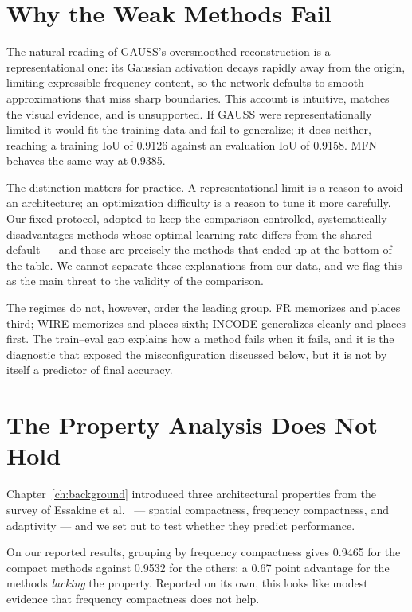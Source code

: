 \section{Why the Weak Methods Fail}

The natural reading of GAUSS's oversmoothed reconstruction is a representational one: its Gaussian activation decays rapidly away from the origin, limiting expressible frequency content, so the network defaults to smooth approximations that miss sharp boundaries. This account is intuitive, matches the visual evidence, and is unsupported. If GAUSS were representationally limited it would fit the training data and fail to generalize; it does neither, reaching a training IoU of 0.9126 against an evaluation IoU of 0.9158. MFN behaves the same way at 0.9385.

The distinction matters for practice. A representational limit is a reason to avoid an architecture; an optimization difficulty is a reason to tune it more carefully. Our fixed protocol, adopted to keep the comparison controlled, systematically disadvantages methods whose optimal learning rate differs from the shared default --- and those are precisely the methods that ended up at the bottom of the table. We cannot separate these explanations from our data, and we flag this as the main threat to the validity of the comparison.

The regimes do not, however, order the leading group. FR memorizes and places third; WIRE memorizes and places sixth; INCODE generalizes cleanly and places first. The train--eval gap explains how a method fails when it fails, and it is the diagnostic that exposed the misconfiguration discussed below, but it is not by itself a predictor of final accuracy.

\section{The Property Analysis Does Not Hold}

Chapter~\ref{ch:background} introduced three architectural properties from the survey of Essakine et al.~\cite{essakine2024inr} --- spatial compactness, frequency compactness, and adaptivity --- and we set out to test whether they predict performance.

On our reported results, grouping by frequency compactness gives 0.9465 for the compact methods against 0.9532 for the others: a 0.67 point advantage for the methods \emph{lacking} the property. Reported on its own, this looks like modest evidence that frequency compactness does not help.

